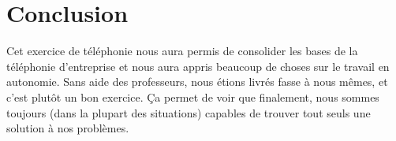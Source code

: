 \documentclass[12pt, a4paper]{article}
\begin{document}
\section{Conclusion}

Cet exercice de téléphonie nous aura permis de consolider les bases de la téléphonie d'entreprise
et nous aura appris beaucoup de choses sur le travail en autonomie. Sans aide des professeurs, 
nous étions livrés fasse à nous mêmes, et c'est plutôt un bon exercice. Ça permet de voir que
finalement, nous sommes toujours (dans la plupart des situations) capables de trouver tout seuls
une solution à nos problèmes.
\end{document}
